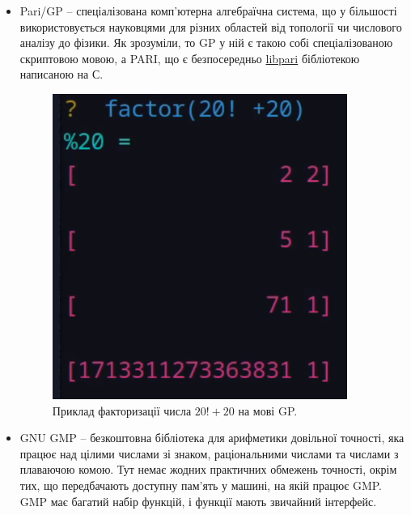 \begin{itemize}
	\item Pari/GP -- спеціалізована комп'ютерна алгебраїчна система, що у більшості використовується науковцями для різних областей від топології чи числового аналізу до фізики. Як зрозуміли, то GP у ній є такою собі спеціалізованою скриптовою мовою, а PARI, що є безпосередньо \href{https://pari.math.u-bordeaux.fr/pub/pari/manuals/2.7.6/libpari.pdf}{libpari} бібліотекою написаною на С.
		
	\begin{figure}[!h]
    		\centering
    		\includegraphics[scale = 0.30]{IMAGES/Rust/pari_gp}
    		\caption{Приклад факторизації числа $20! + 20$ на мові GP.}
    		\label{fig:}
	\end{figure}

	
	\item GNU GMP -- безкоштовна бібліотека для арифметики довільної точності, яка працює над цілими числами зі знаком, раціональними числами та числами з плаваючою комою. Тут немає жодних практичних обмежень точності, окрім тих, що передбачають доступну пам’ять у машині, на якій працює GMP. GMP  має багатий набір функцій, і функції мають звичайний інтерфейс.
	

\end{itemize}
